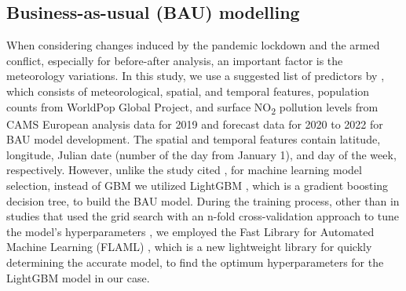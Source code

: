 \subsection{Business-as-usual (BAU) modelling} \label{chap3_bau}
When considering changes induced by the pandemic lockdown and the armed conflict, especially for before-after analysis, an important factor is the meteorology variations. In this study, we use a suggested list of predictors by \citep{barre2021estimating}, which consists of meteorological, spatial, and temporal features, population counts from WorldPop Global Project, and surface NO\textsubscript{2} pollution levels from CAMS European analysis data for 2019 and forecast data for 2020 to 2022 for BAU model development. The spatial and temporal features contain latitude, longitude, Julian date (number of the day from January 1), and day of the week, respectively. However, unlike the study cited \citep{barre2021estimating}, for machine learning model selection, instead of GBM we utilized LightGBM \citep{ke2017lightgbm}, which is a gradient boosting decision tree, to build the BAU model. During the training process, other than in studies that used the grid search with an n-fold cross-validation approach to tune the model’s hyperparameters \citep{barre2021estimating,petetin2020meteorology}, we employed the Fast Library for Automated Machine Learning (FLAML) \citep{wang2021flaml}, which is a new lightweight library for quickly determining the accurate model, to find the optimum hyperparameters for the LightGBM model in our case. \par
